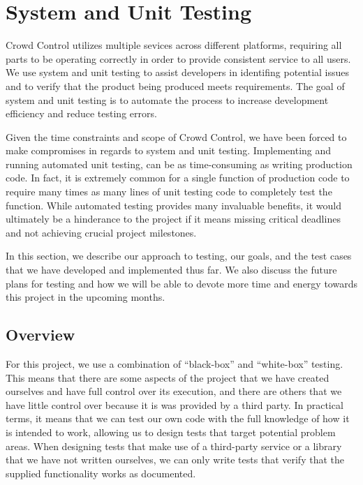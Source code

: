 

\chapter{System and Unit Testing}

Crowd Control utilizes multiple sevices across different platforms, requiring
all parts to be operating correctly in order to provide consistent service to
all users. We use system and unit testing to assist developers in identifing 
potential issues and to verify that the product being produced meets
requirements. The goal of system and unit testing is to automate the process to
increase development efficiency and reduce testing errors.

Given the time constraints and scope of Crowd Control, we have been forced to
make compromises in regards to system and unit testing. Implementing and running
automated unit testing, can be as time-consuming as writing production code. In
fact, it is extremely common for a single function of production code to require
many times as many lines of unit testing code to completely test the function.
While automated testing provides many invaluable benefits, it would ultimately be
a hinderance to the project if it means missing critical deadlines and not
achieving crucial project milestones.

In this section, we describe our approach to testing, our goals, and the test
cases that we have developed and implemented thus far. We also discuss the
future plans for testing and how we will be able to devote more time and energy
towards this project in the upcoming months.


\section{Overview}

For this project, we use a combination of ``black-box'' and ``white-box''
testing. This means that there are some aspects of the project that we have
created ourselves and have full control over its execution, and there are others
that we have little control over because it is was provided by a third party.
In practical terms, it means that we can test our own code with the full
knowledge of how it is intended to work, allowing us to design tests that target
potential problem areas. When designing tests that make use of a third-party
service or a library that we have not written ourselves, we can only write tests
that verify that the supplied functionality works as documented.

